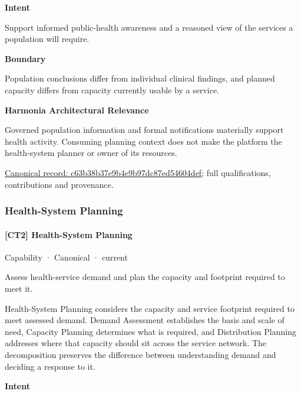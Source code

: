 \textbf{Intent}



Support informed public-health awareness and a reasoned view of the services a population will require.



\textbf{Boundary}



Population conclusions differ from individual clinical findings, and planned capacity differs from capacity currently usable by a service.



\textbf{Harmonia Architectural Relevance}



Governed population information and formal notifications materially support health activity. Consuming planning context does not make the platform the health-system planner or owner of its resources.


{\footnotesize \href{../../../../continuum/strategy/capability/c63b38b37e9b4e9b97dc87ed54604def.md}{Canonical record: c63b38b37e9b4e9b97dc87ed54604def}; full qualifications, contributions and provenance.}\par
\subsubsection{Health-System Planning}

\paragraph{[CT2] Health-System Planning}

\label{element:9ca4df07eceb4150a0190cc488270ce2}
{\small Capability · Canonical · current}\par

Assess health-service demand and plan the capacity and footprint required to meet it.



Health-System Planning considers the capacity and service footprint required to meet assessed demand. Demand Assessment establishes the basis and scale of need, Capacity Planning determines what is required, and Distribution Planning addresses where that capacity should sit across the service network. The decomposition preserves the difference between understanding demand and deciding a response to it.



\textbf{Intent}



